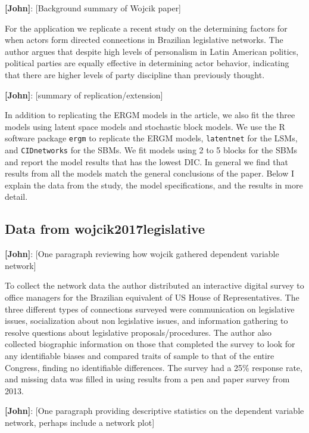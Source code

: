 \documentclass[fleqn,12pt]{wlscirep}
\begin{document}
{\bf [John]}: [Background summary of Wojcik paper]

For the application we replicate a recent study on the determining factors for when actors form directed connections in Brazilian legislative networks. The author argues that despite high levels of personalism in Latin American politics, political parties are equally effective in determining actor behavior, indicating that there are higher levels of party discipline than previously thought.


{\bf [John]}: [summary of replication/extension]

In addition to replicating the ERGM models in the article, we also fit the three models using latent space models and stochastic block models. We use the R software package \texttt{ergm} to replicate the ERGM models, \texttt{latentnet} for the LSMs, and \texttt{CIDnetworks} for the SBMs.  We fit models using 2 to 5 blocks for the SBMs and report the model results that has the lowest DIC. In general we find that results from all the models match the general conclusions of the paper. Below I explain the data from the study, the model specifications, and the results in more detail.

\subsection{Data from wojcik2017legislative}

{\bf [John]}: [One paragraph reviewing how wojcik gathered dependent variable network] 

To collect the network data the author distributed an interactive digital survey to office managers for the Brazilian equivalent of US House of Representatives. The three different types of connections surveyed were communication on legislative issues, socialization about non legislative issues, and information gathering to resolve questions about legislative proposals/procedures. The author also collected biographic information on those that completed the survey to look for any identifiable biases and compared traits of sample to that of the entire Congress, finding no identifiable differences. The survey had a 25\% response rate, and missing data was filled in using results from a pen and paper survey from 2013.

{\bf [John]}: [One paragraph providing descriptive statistics on the dependent variable network, perhaps include a network plot]
\end{document}
